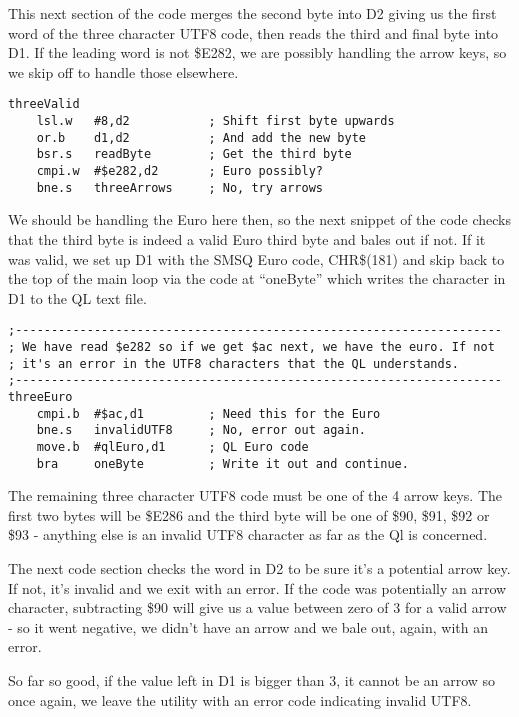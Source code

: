 This next section of the code merges the second byte into D2 giving
us the first word of the three character UTF8 code, then reads the
third and final byte into D1. If the leading word is not \$E282, we
are possibly handling the arrow keys, so we skip off to handle those
elsewhere.

\begin{lstlisting}[firstnumber=last,caption={Utf82Ql: Fetching the third byte}]
threeValid
    lsl.w   #8,d2           ; Shift first byte upwards
    or.b    d1,d2           ; And add the new byte
    bsr.s   readByte        ; Get the third byte
    cmpi.w  #$e282,d2       ; Euro possibly?
    bne.s   threeArrows     ; No, try arrows
\end{lstlisting}

We should be handling the Euro here then, so the next snippet of the
code checks that the third byte is indeed a valid Euro third byte
and bales out if not. If it was valid, we set up D1 with the SMSQ
Euro code, CHR\$(181) and skip back to the top of the main loop via
the code at ``oneByte'' which writes the character in D1 to the
QL text file.

\begin{lstlisting}[firstnumber=last,caption={Utf82Ql: Handling the Euro Currency symbol}]
;--------------------------------------------------------------------
; We have read $e282 so if we get $ac next, we have the euro. If not
; it's an error in the UTF8 characters that the QL understands.
;--------------------------------------------------------------------
threeEuro
    cmpi.b  #$ac,d1         ; Need this for the Euro
    bne.s   invalidUTF8     ; No, error out again.
    move.b  #qlEuro,d1      ; QL Euro code
    bra     oneByte         ; Write it out and continue.
\end{lstlisting}

The remaining three character UTF8 code must be one of the 4 arrow
keys. The first two bytes will be \$E286 and the third byte will be
one of \$90, \$91, \$92 or \$93 - anything else is an invalid UTF8
character as far as the Ql is concerned.

The next code section checks the word in D2 to be sure it's a potential
arrow key. If not, it's invalid and we exit with an error. If the
code was potentially an arrow character, subtracting \$90 will give
us a value between zero of 3 for a valid arrow - so it went negative,
we didn't have an arrow and we bale out, again, with an error.

So far so good, if the value left in D1 is bigger than 3, it cannot
be an arrow so once again, we leave the utility with an error code
indicating invalid UTF8.

